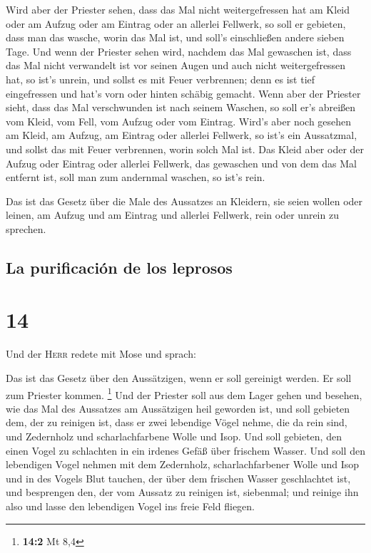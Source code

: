  Wird aber der Priester sehen, dass das Mal nicht
weitergefressen hat am Kleid oder am Aufzug oder am Eintrag oder an
allerlei Fellwerk,  so soll er gebieten, dass man das
wasche, worin das Mal ist, und soll's einschließen andere sieben Tage.
 Und wenn der Priester sehen wird, nachdem das Mal
gewaschen ist, dass das Mal nicht verwandelt ist vor seinen Augen und
auch nicht weitergefressen hat, so ist's unrein, und sollst es mit Feuer
verbrennen; denn es ist tief eingefressen und hat's vorn oder hinten
schäbig gemacht.  Wenn aber der Priester sieht, dass das
Mal verschwunden ist nach seinem Waschen, so soll er's abreißen vom
Kleid, vom Fell, vom Aufzug oder vom Eintrag.  Wird's
aber noch gesehen am Kleid, am Aufzug, am Eintrag oder allerlei
Fellwerk, so ist's ein Aussatzmal, und sollst das mit Feuer verbrennen,
worin solch Mal ist.  Das Kleid aber oder der Aufzug oder
Eintrag oder allerlei Fellwerk, das gewaschen und von dem das Mal
entfernt ist, soll man zum andernmal waschen, so ist's rein.

 Das ist das Gesetz über die Male des Aussatzes an
Kleidern, sie seien wollen oder leinen, am Aufzug und am Eintrag und
allerlei Fellwerk, rein oder unrein zu sprechen.

\hypertarget{la-purificaciuxf3n-de-los-leprosos}{%
\subsection{La purificación de los
leprosos}\label{la-purificaciuxf3n-de-los-leprosos}}

\hypertarget{section-13}{%
\section{14}\label{section-13}}

 Und der \textsc{Herr} redete mit Mose und sprach:

 Das ist das Gesetz über den Aussätzigen, wenn er soll
gereinigt werden. Er soll zum Priester kommen. \footnote{\textbf{14:2}
  Mt 8,4}  Und der Priester soll aus dem Lager gehen und
besehen, wie das Mal des Aussatzes am Aussätzigen heil geworden ist,
 und soll gebieten dem, der zu reinigen ist, dass er zwei
lebendige Vögel nehme, die da rein sind, und Zedernholz und
scharlachfarbene Wolle und Isop.  Und soll gebieten, den
einen Vogel zu schlachten in ein irdenes Gefäß über frischem Wasser.
 Und soll den lebendigen Vogel nehmen mit dem Zedernholz,
scharlachfarbener Wolle und Isop und in des Vogels Blut tauchen, der
über dem frischen Wasser geschlachtet ist,  und besprengen
den, der vom Aussatz zu reinigen ist, siebenmal; und reinige ihn also
und lasse den lebendigen Vogel ins freie Feld fliegen.

